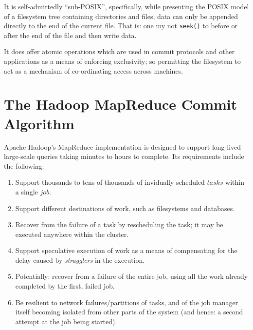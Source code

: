 \documentclass[9pt,technote]{IEEEtran}
\begin{document}
It is self-admittedly ``sub-POSIX'', specifically, while presenting the POSIX
model of a filesystem tree containing directories and files, data can only be
appended directly to the end of the current file.
That is: one my not \texttt{seek()} to before or after the end of the file and
then write data.

It does offer atomic operations which are used in commit protocols and other
applications as a means of enforcing exclusivity;
so permitting the filesystem to act as a mechanism of co-ordinating access across machines.


\section{The Hadoop MapReduce Commit Algorithm}
\label{sec:mr}


Apache Hadoop's MapReduce implementation is designed to support long-lived
large-scale queries taking minutes to hours to complete.
Its requirements include the following:

\begin{enumerate}

\item Support thousands to tens of thousands of invidually scheduled $tasks$
within a single $job$.

\item Support different destinations of work, such as filesystems and databases.

\item Recover from the failure of a task by rescheduling the task;
it may be executed anywhere within the cluster.

\item Support speculative execution of work as a means of compensating for the
delay caused by \emph{stragglers} in the execution.

\item Potentially: recover from a failure of the entire job, using all the work
already completed by the first, failed job.

\item Be resilient to network failures/partitions of tasks, and of the job manager
itself becoming isolated from other parts of the system (and hence: a second
attempt at the job being started).

\end{enumerate}
\end{document}
